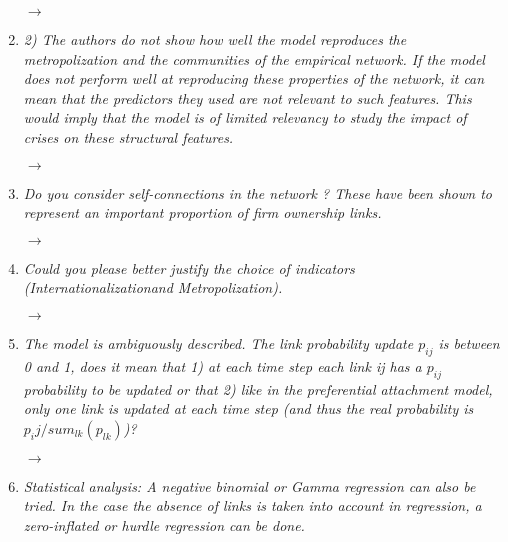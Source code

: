 \documentclass[10pt,a4paper,sans]{moderncv}        %
\begin{document}
\begin{enumerate}
	$\rightarrow$ 
	
	\medskip
	
	\item \textit{2) The authors do not show how well the model reproduces the metropolization and the communities of the empirical network. If the model does not perform well at reproducing these properties of the network, it can mean that the predictors they used are not relevant to such features. This would imply that the model is of limited relevancy to study the impact of crises on these structural features.}
	
	$\rightarrow$ 
	
	\medskip


	\item \textit{Do you consider self-connections in the network ? These have been shown to represent an important proportion of firm ownership links.}
	
	$\rightarrow$ 
	
	\medskip
	
	\item \textit{Could you please better justify the choice of indicators (Internationalizationand Metropolization).}
	
	$\rightarrow$ 
	
	\medskip



	\item \textit{The model is ambiguously described. The link probability update $p_{ij}$ is between 0 and 1, does it mean that 1) at each time step each link ij has a $p_{ij}$ probability to be updated or that 2) like in the preferential attachment model, only one link is updated at each time step (and thus the real probability is $p_ij/sum_{lk}(p_{lk})$)?}
	
	$\rightarrow$ 
	
	\medskip


	\item \textit{Statistical analysis: A negative binomial or Gamma regression can also be tried. In the case the absence of links is taken into account in regression, a zero-inflated or hurdle regression can be done.}
	 

\end{enumerate}
\end{document}
